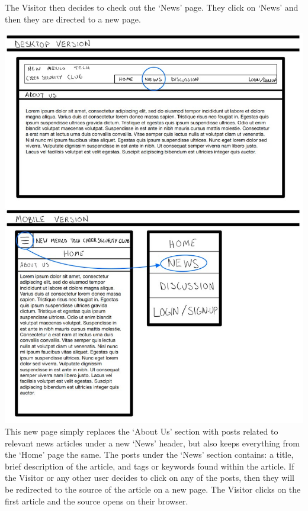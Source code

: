 \documentclass{article}
\begin{document}
The Visitor then decides to check out the ‘News’ page.  They click on ‘News’ and then they are directed to a new page.  
\par
\includegraphics[scale=0.60]{visitor_2.jpg}
This new page simply replaces the ‘About Us’ section with posts related to relevant news articles under a new ‘News’ header, but also keeps everything from the ‘Home’ page the same.  The posts under the ‘News’ section contains: a title, brief description of the article, and tags or keywords found within the article.  If the Visitor or any other user decides to click on any of the posts, then they will be redirected to the source of the article on a new page.  The Visitor clicks on the first article and the source opens on their browser.
\par
\end{document}
